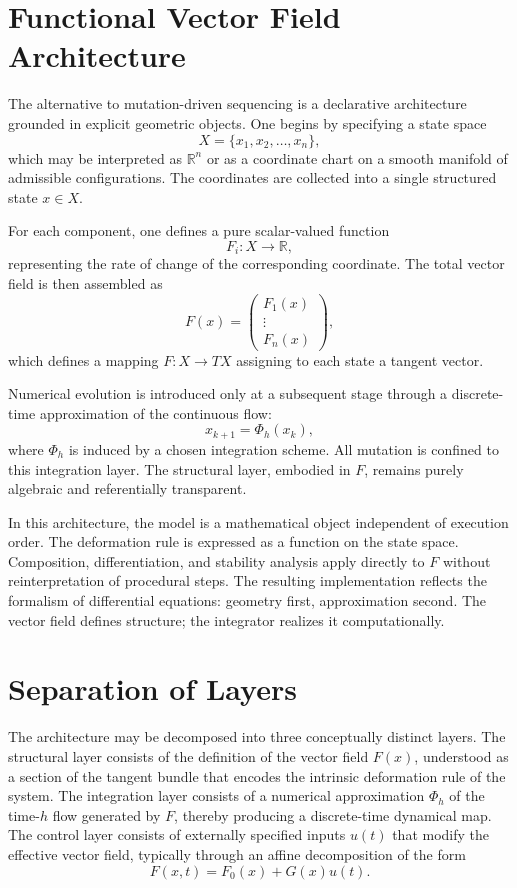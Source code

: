 \documentclass[12pt]{book}
\begin{document}
\section{Functional Vector Field Architecture}

The alternative to mutation-driven sequencing is a declarative
architecture grounded in explicit geometric objects. One begins by
specifying a state space
\[
X = \{ x_1, x_2, \dots, x_n \},
\]
which may be interpreted as $\mathbb{R}^n$ or as a coordinate chart on
a smooth manifold of admissible configurations. The coordinates are
collected into a single structured state $x \in X$.

For each component, one defines a pure scalar-valued function
\[
F_i : X \to \mathbb{R},
\]
representing the rate of change of the corresponding coordinate. The
total vector field is then assembled as
\[
F(x) =
\begin{pmatrix}
F_1(x) \\
\vdots \\
F_n(x)
\end{pmatrix},
\]
which defines a mapping $F : X \to TX$ assigning to each state a
tangent vector.

Numerical evolution is introduced only at a subsequent stage through a
discrete-time approximation of the continuous flow:
\[
x_{k+1} = \Phi_h(x_k),
\]
where $\Phi_h$ is induced by a chosen integration scheme. All mutation
is confined to this integration layer. The structural layer, embodied
in $F$, remains purely algebraic and referentially transparent.

In this architecture, the model is a mathematical object independent of
execution order. The deformation rule is expressed as a function on the
state space. Composition, differentiation, and stability analysis apply
directly to $F$ without reinterpretation of procedural steps. The
resulting implementation reflects the formalism of differential
equations: geometry first, approximation second. The vector field
defines structure; the integrator realizes it computationally.

\section{Separation of Layers}

The architecture may be decomposed into three conceptually distinct
layers. The structural layer consists of the definition of the vector
field $F(x)$, understood as a section of the tangent bundle that
encodes the intrinsic deformation rule of the system. The integration
layer consists of a numerical approximation $\Phi_h$ of the time-$h$
flow generated by $F$, thereby producing a discrete-time dynamical
map. The control layer consists of externally specified inputs $u(t)$
that modify the effective vector field, typically through an affine
decomposition of the form
\[
F(x,t) = F_0(x) + G(x)u(t).
\]
\end{document}
